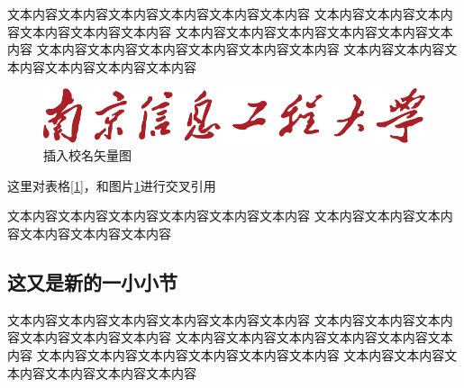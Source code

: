 \documentclass[a4paper,oneside]{ctexbook}
\begin{document}
文本内容文本内容文本内容文本内容文本内容文本内容
文本内容文本内容文本内容文本内容文本内容文本内容
文本内容文本内容文本内容文本内容文本内容文本内容
文本内容文本内容文本内容文本内容文本内容文本内容
文本内容文本内容文本内容文本内容文本内容文本内容

\begin{figure}[h]
    \centering
    \caption{插入校名矢量图}\label{2}
    \includegraphics[scale=0.8]{name.pdf}
\end{figure}

这里对表格\ref{1}，和图片\ref{2}进行交叉引用

文本内容文本内容文本内容文本内容文本内容文本内容
文本内容文本内容文本内容文本内容文本内容文本内容

\subsection{这又是新的一小小节}

文本内容文本内容文本内容文本内容文本内容文本内容
文本内容文本内容文本内容文本内容文本内容文本内容
文本内容文本内容文本内容文本内容文本内容文本内容
文本内容文本内容文本内容文本内容文本内容文本内容
文本内容文本内容文本内容文本内容文本内容文本内容
\end{document}

